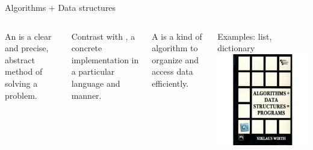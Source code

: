 \documentclass[aspectratio=169,usenames,dvipsnames]{beamer}
\begin{document}
\begin{frame}{Algorithms + Data structures}
    \begin{columns}
            \begin{definition}
                An  is a clear and precise,
                abstract method of solving a problem.
            \end{definition}
            Contrast with , a concrete
            implementation in a particular language and manner. 

            \pause
            \begin{definition}
                A  is a kind of algorithm
                to organize and access data efficiently.

            \end{definition}
            Examples: list, dictionary
            \includegraphics[height=0.6\textheight]{fig/wirth}
    \end{columns}
\end{frame}
\end{document}
